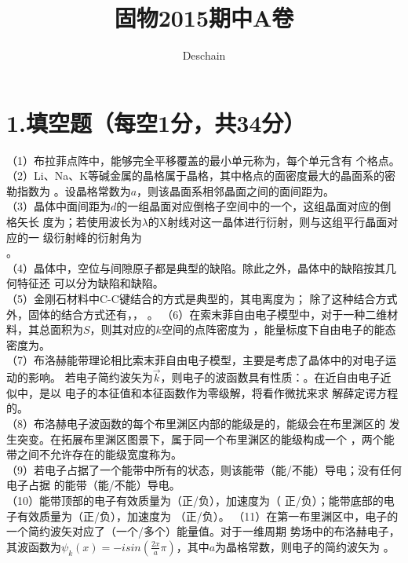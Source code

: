 \documentclass[UTF8]{ctexart}
\title{固物2015期中A卷}
\author{Deschain}
\begin{document}
\maketitle
\section*{\bfseries 1.填空题（每空1分，共34分）}
（1）布拉菲点阵中，能够完全平移覆盖的最小单元称为\uline{\makebox[3em]{}}，每个单元含有
\uline{\makebox[2em]{}}个格点。\\
（2）Li、Na、K等碱金属的晶格属于\uline{\makebox[6em]{}}晶格，其中格点的面密度最大的晶面系的密勒指数为
\uline{\makebox[4em]{}}。设晶格常数为$a$，则该晶面系相邻晶面之间的面间距为\uline{\makebox[4em]{}}。\\
（3）晶体中面间距为$d$的一组晶面对应倒格子空间中的一个\uline{\makebox[3em]{}}，这组晶面对应的倒格矢长
度为\uline{\makebox[3em]{}}；若使用波长为$\lambda$的X射线对这一晶体进行衍射，则与这组平行晶面对应的一
级衍射峰的衍射角为\\
\uline{\makebox[9em]{}}。\\
（4）晶体中，空位与间隙原子都是典型的\uline{\makebox[2em]{}}缺陷。除此之外，晶体中的缺陷按其几何特征还
可以分为\uline{\makebox[2em]{}}缺陷和\uline{\makebox[2em]{}}缺陷。\\
（5）金刚石材料中C-C键结合的方式是典型的\uline{\makebox[6em]{}}，其电离度为\uline{\makebox[2em]{}}；
除了这种结合方式外，固体的结合方式还有\uline{\makebox[6em]{}}，\uline{\makebox[6em]{}}，
\uline{\makebox[9em]{}}。
（6）在索末菲自由电子模型中，对于一种二维材料，其总面积为$S$，则其对应的$k$空间的点阵密度为
\uline{\makebox[4em]{}}，能量标度下自由电子的能态密度为\uline{\makebox[4em]{}}。\\
（7）布洛赫能带理论相比索末菲自由电子模型，主要是考虑了晶体中的\uline{\makebox[8em]{}}对电子运动的影响。
若电子简约波矢为$\vec{k}$，则电子的波函数具有性质：\uline{\makebox[15em]{}}。在近自由电子近似中，是以
\uline{\makebox[3em]{}}电子的本征值和本征函数作为零级解，将\uline{\makebox[10em]{}}看作微扰来求
解薛定谔方程的。\\
（8）布洛赫电子波函数的每个布里渊区内部的能级是\uline{\makebox[4em]{}}的，能级会在布里渊区的
\uline{\makebox[3em]{}}发生突变。在拓展布里渊区图景下，属于同一个布里渊区的能级构成一个
\uline{\makebox[3em]{}}，两个能带之间不允许存在的能级宽度称为\uline{\makebox[3em]{}}。\\
（9）若电子占据了一个能带中所有的状态，则该能带\uline{\makebox[3em]{}}（能/不能）导电；没有任何电子占据
的能带\uline{\makebox[3em]{}}（能/不能）导电。\\
（10）能带顶部的电子有效质量为\uline{\makebox[2em]{}}（正/负），加速度为\uline{\makebox[2em]{}}（
正/负）；能带底部的电子有效质量为\uline{\makebox[2em]{}}（正/负），加速度为\uline{\makebox[2em]{}}
（正/负）。
（11）在第一布里渊区中，电子的一个简约波矢对应了\uline{\makebox[3em]{}}（一个/多个）能量值。对于一维周期
势场中的布洛赫电子，其波函数为$\psi_k(x)=-isin(\frac{2x}{a}\pi)$，其中$a$为晶格常数，则电子的简约波矢为
\uline{\makebox[2em]{}}。\\
\end{document}

